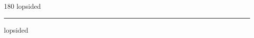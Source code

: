 
\begin{frame}
\begin{center}
\begin{turn}{180}
{\fontsize{2.5cm}{1em}\selectfont lopsided}
\end{turn}
\vspace{1em}\par  
\hrule
\vspace{1em}\par  
{\fontsize{2.5cm}{1em}\selectfont lopsided}
\end{center}
\end{frame}
